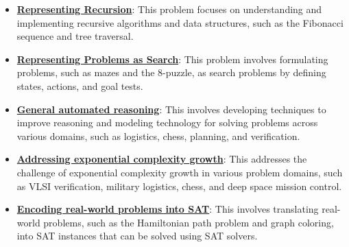 \documentclass{article}%
\begin{document}
\begin{itemize}[leftmargin=*]
\item \href{https://purdue.brightspace.com/d2l/common/assets/pdfjs-d2l-dist/1.0.14-legacy/web/viewer.html?file=\%2Fcontent\%2Fenforced\%2F1095467-wl.202510.CS.24300.001\%2F14L1-DepthFS.pdf\%3Fou\%3D1095467\&lang=en-us\&container=d2l-fileviewer-rendered-pdf\&fullscreen=d2l-fileviewer-rendered-pdf-dialog\&height=667#page=3}{\textbf{Representing Recursion}}: This problem focuses on understanding and implementing recursive algorithms and data structures, such as the Fibonacci sequence and tree traversal.%
\item \href{https://purdue.brightspace.com/d2l/common/assets/pdfjs-d2l-dist/1.0.14-legacy/web/viewer.html?file=\%2Fcontent\%2Fenforced\%2F1095467-wl.202510.CS.24300.001\%2F14L1-DepthFS.pdf\%3Fou\%3D1095467\&lang=en-us\&container=d2l-fileviewer-rendered-pdf\&fullscreen=d2l-fileviewer-rendered-pdf-dialog\&height=667#page=14}{\textbf{Representing Problems as Search}}: This problem involves formulating problems, such as mazes and the 8-puzzle, as search problems by defining states, actions, and goal tests.%
\item \href{https://purdue.brightspace.com/d2l/common/assets/pdfjs-d2l-dist/1.0.14-legacy/web/viewer.html?file=\%2Fcontent\%2Fenforced\%2F1095467-wl.202510.CS.24300.001\%2F15L2-SAT.pdf\%3Fou\%3D1095467\&lang=en-us\&container=d2l-fileviewer-rendered-pdf\&fullscreen=d2l-fileviewer-rendered-pdf-dialog\&height=667#page=3}{\textbf{General automated reasoning}}: This involves developing techniques to improve reasoning and modeling technology for solving problems across various domains, such as logistics, chess, planning, and verification.%
\item \href{https://purdue.brightspace.com/d2l/common/assets/pdfjs-d2l-dist/1.0.14-legacy/web/viewer.html?file=\%2Fcontent\%2Fenforced\%2F1095467-wl.202510.CS.24300.001\%2F15L2-SAT.pdf\%3Fou\%3D1095467\&lang=en-us\&container=d2l-fileviewer-rendered-pdf\&fullscreen=d2l-fileviewer-rendered-pdf-dialog\&height=667#page=4}{\textbf{Addressing exponential complexity growth}}: This addresses the challenge of exponential complexity growth in various problem domains, such as VLSI verification, military logistics, chess, and deep space mission control.%
\item \href{https://purdue.brightspace.com/d2l/common/assets/pdfjs-d2l-dist/1.0.14-legacy/web/viewer.html?file=\%2Fcontent\%2Fenforced\%2F1095467-wl.202510.CS.24300.001\%2F15L2-SAT.pdf\%3Fou\%3D1095467\&lang=en-us\&container=d2l-fileviewer-rendered-pdf\&fullscreen=d2l-fileviewer-rendered-pdf-dialog\&height=667#page=40}{\textbf{Encoding real-world problems into SAT}}: This involves translating real-world problems, such as the Hamiltonian path problem and graph coloring, into SAT instances that can be solved using SAT solvers.%
\end{itemize}
\end{document}
